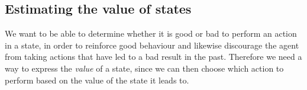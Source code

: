 \documentclass[11pt]{article}
\begin{document}
\maketitle


\subsection{Estimating the value of states}\label{est_vals}

We want to be able to determine whether it is good or bad to
perform an action in a state, in order to reinforce good behaviour
and likewise discourage the agent from taking actions that have led
to a bad result in the past.
Therefore we need a way to express the \textit{value} of a state,
since we can then choose which action to perform
based on the value of the state it leads to. 
\end{document}
